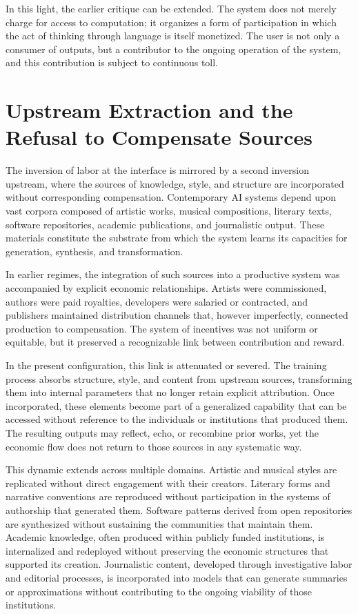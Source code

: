 \documentclass[12pt, oneside]{article}
\begin{document}
In this light, the earlier critique can be extended. The system does not merely charge for access to computation; it organizes a form of participation in which the act of thinking through language is itself monetized. The user is not only a consumer of outputs, but a contributor to the ongoing operation of the system, and this contribution is subject to continuous toll.

\section{Upstream Extraction and the Refusal to Compensate Sources}

The inversion of labor at the interface is mirrored by a second inversion upstream, where the sources of knowledge, style, and structure are incorporated without corresponding compensation. Contemporary AI systems depend upon vast corpora composed of artistic works, musical compositions, literary texts, software repositories, academic publications, and journalistic output. These materials constitute the substrate from which the system learns its capacities for generation, synthesis, and transformation.

In earlier regimes, the integration of such sources into a productive system was accompanied by explicit economic relationships. Artists were commissioned, authors were paid royalties, developers were salaried or contracted, and publishers maintained distribution channels that, however imperfectly, connected production to compensation. The system of incentives was not uniform or equitable, but it preserved a recognizable link between contribution and reward.

In the present configuration, this link is attenuated or severed. The training process absorbs structure, style, and content from upstream sources, transforming them into internal parameters that no longer retain explicit attribution. Once incorporated, these elements become part of a generalized capability that can be accessed without reference to the individuals or institutions that produced them. The resulting outputs may reflect, echo, or recombine prior works, yet the economic flow does not return to those sources in any systematic way.

This dynamic extends across multiple domains. Artistic and musical styles are replicated without direct engagement with their creators. Literary forms and narrative conventions are reproduced without participation in the systems of authorship that generated them. Software patterns derived from open repositories are synthesized without sustaining the communities that maintain them. Academic knowledge, often produced within publicly funded institutions, is internalized and redeployed without preserving the economic structures that supported its creation. Journalistic content, developed through investigative labor and editorial processes, is incorporated into models that can generate summaries or approximations without contributing to the ongoing viability of those institutions.
\end{document}
